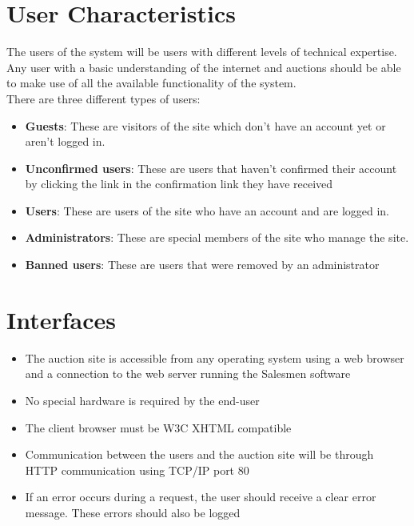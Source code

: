 \section{User Characteristics}
	The users of the system will be users with different levels of 
	technical expertise. Any user with a basic understanding of the 
	internet and auctions should be able to make use of all the 
	available functionality of the system.\\
	There are three different types of users:
	\begin{itemize}
		\item \textbf{Guests}: These are visitors of the site which don't 
		have an account yet or aren't logged in.
		\item \textbf{Unconfirmed users}: These are users that haven't confirmed 
		their account by clicking the link in the confirmation link they have received
		\item \textbf{Users}: These are users of the site who have an 
		account and are logged in.
		\item \textbf{Administrators}: These are special members of the 
		site who manage the site.
		\item \textbf{Banned users}: These are users that were removed by
		an administrator
	\end{itemize}
\section{Interfaces}

	\begin{itemize}
		\item The auction site is accessible from any operating system using 
			a web browser and a connection to the web server running the
			Salesmen software
		\item No special hardware is required by the end-user
		\item The client browser must be W3C XHTML compatible
		\item Communication between the users and the auction site will be
			through HTTP communication using TCP/IP port 80
		\item If an error occurs during a request, the user should receive 
			a clear error message. These errors should also be logged			
	\end{itemize}
	
